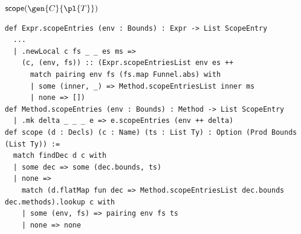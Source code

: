 \begin{cmp}{$\mathsf{scope}(\gen{C}{\pl{T}})$}
\begin{paperside}
\end{paperside}
\begin{leanside}
\begin{lstlisting}[style=leanside]
def Expr.scopeEntries (env : Bounds) : Expr -> List ScopeEntry
  ...
  | .newLocal c fs _ _ es ms =>
    (c, (env, fs)) :: (Expr.scopeEntriesList env es ++
      match pairing env fs (fs.map Funnel.abs) with
      | some (inner, _) => Method.scopeEntriesList inner ms
      | none => [])
def Method.scopeEntries (env : Bounds) : Method -> List ScopeEntry
  | .mk delta _ _ _ e => e.scopeEntries (env ++ delta)
def scope (d : Decls) (c : Name) (ts : List Ty) : Option (Prod Bounds (List Ty)) :=
  match findDec d c with
  | some dec => some (dec.bounds, ts)
  | none =>
    match (d.flatMap fun dec => Method.scopeEntriesList dec.bounds dec.methods).lookup c with
    | some (env, fs) => pairing env fs ts
    | none => none
\end{lstlisting}
\end{leanside}
\end{cmp}

